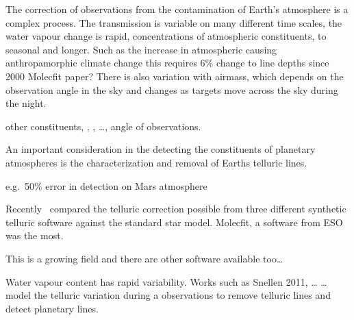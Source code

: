 The correction of observations from the contamination of Earth's atmosphere is a complex process.
The transmission is variable on many different time scales, the water vapour change is rapid, concentrations of atmospheric constituents, to seasonal and longer.
Such as the increase in atmospheric  causing anthropamorphic climate change this requires 6\% change to  line depths since 2000 Molecfit paper?
There is also variation with airmass, which depends on the observation angle in the sky and changes as targets move across the sky during the night.

other constituents, , ,  \ldots{}, angle of observations.

An important consideration in the detecting the constituents of planetary atmospheres is the characterization and removal of Earths telluric lines.

e.g.\ 50\% error in  detection on Mars atmosphere


Recently~\citet{ulmer-moll_telluric_2018} compared the telluric correction possible from three different synthetic telluric software against the standard star model.
Molecfit, a software from ESO was the most.

This is a growing field and there are other software available too\ldots{}


Water vapour content has rapid variability.
Works such as Snellen 2011, \ldots{} \ldots{} model the telluric variation during a observations to remove telluric lines and detect planetary lines.



